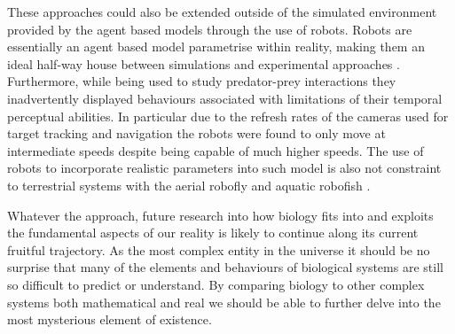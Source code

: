 These approaches could also be extended outside of the simulated environment provided by the agent based models through the use of robots. Robots are essentially an agent based model parametrise within reality, making them an ideal half-way house between simulations and experimental approaches \citep{floreano2010evolution}. Furthermore, while being used to study predator-prey interactions they inadvertently displayed behaviours associated with limitations of their temporal perceptual abilities. In particular due to the refresh rates of the cameras used for target tracking and navigation the robots were found to only move at intermediate speeds despite being capable of much higher speeds. The use of robots to incorporate realistic parameters into such model is also not constraint to terrestrial systems with the aerial robofly \citep{lauder2001aerodynamics} and aquatic robofish \citep{faria2010novel}.


Whatever the approach, future research into how biology fits into and exploits the fundamental aspects of our reality is likely to continue along its current fruitful trajectory. As the most complex entity in the universe it should be no surprise that many of the elements and behaviours of biological systems are still so difficult to predict or understand. By comparing biology to other complex systems both mathematical and real we should be able to further delve into the most mysterious element of existence.








